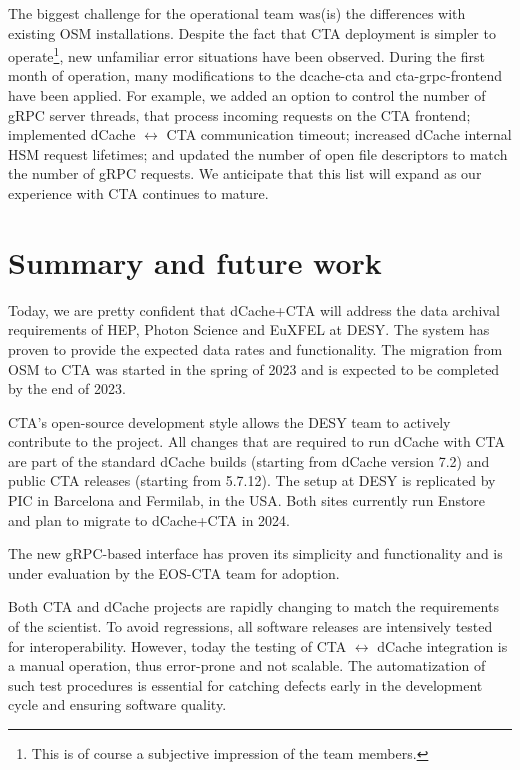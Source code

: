 \documentclass{webofc}
\begin{document}
The biggest challenge for the operational team was(is) the differences with existing OSM installations. Despite the fact that CTA deployment is simpler to operate\footnote{This is of course a subjective impression of the team members.}, new unfamiliar error situations have been observed. During the first month of operation, many modifications to the dcache-cta and cta-grpc-frontend have been applied. For example, we added an option to control the number of gRPC server threads, that process incoming requests on the CTA frontend; implemented dCache $\leftrightarrow$ CTA communication timeout; increased dCache internal HSM request lifetimes; and updated the number of open file descriptors to match the number of gRPC requests. We anticipate that this list will expand as our experience with CTA continues to mature.


\section{Summary and future work}
\label{summary}

Today, we are pretty confident that dCache+CTA will address the data archival requirements of HEP, Photon Science and EuXFEL at DESY. The system has proven to provide the expected data rates and functionality. The migration from OSM to CTA was started in the spring of 2023 and is expected to be completed by the end of 2023.

CTA's open-source development style allows the DESY team to actively contribute to the project. All changes that are required to run dCache with CTA are part of the standard dCache builds (starting from dCache version 7.2) and public CTA releases (starting from 5.7.12). The setup at DESY is replicated by PIC in Barcelona and Fermilab, in the USA. Both sites currently run Enstore\cite{enstore} and plan to migrate to dCache+CTA in 2024.
 
The new gRPC-based interface has proven its simplicity and functionality and is under evaluation by the EOS-CTA team for adoption.

Both CTA and dCache projects are rapidly changing to match the requirements of the scientist. To avoid regressions, all software releases are intensively tested for interoperability. However, today the testing of CTA $\leftrightarrow$ dCache integration is a manual operation, thus error-prone and not scalable. The automatization of such test procedures is essential for catching defects early in the development cycle and ensuring software quality.


\end{document}
